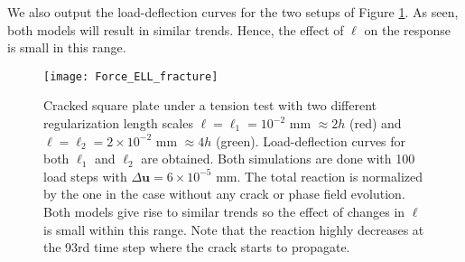 We also output the load-deflection curves for the two setups of Figure \ref{Fig:Notched_lenght_scale}. As seen, both models will result in similar trends. Hence, the effect of $\ell$ on the response is small in this range.

\begin{figure}[htbp]
    \centering
    \texttt{[image: Force\_ELL\_fracture]}
    \caption{Cracked square plate under a tension test {with two different regularization length scales $\ell=\ell_1 =  10^{-2}$ mm $\approx 2h$ (red) and $\ell=\ell_2= 2\times 10^{-2}$ mm $\approx 4h$ (green)}. Load-deflection curves for both $\ell_1$ and $\ell_2$ are obtained. Both simulations are done with 100 load steps with $\Delta\bm{u}=6 \times 10^{-5}$ mm. The total reaction is normalized by the one in the case without any crack or phase field evolution. Both models give rise to similar trends so the effect of changes in $\ell$ is small within this range. Note that the reaction highly decreases at the 93rd time step where the crack starts to propagate.}
    \label{Fig:Notched_lenght_scale}
\end{figure}



